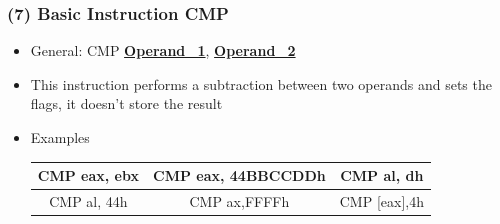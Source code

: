 \documentclass[]{beamer}
\begin{document}
		\begin{frame}
			\frametitle{(7) Basic Instruction CMP}
			\begin{itemize}
				\item{General: CMP \underline{\textbf{Operand\_1}}, \underline{\textbf{Operand\_2}}}\\

				\item{This instruction performs a subtraction between two operands and sets  the flags, it doesn't store the result}
				\item{Examples}
					\begin{table}[h]
						\begin{tabular}{|c|c|c|}
							\hline
							CMP eax, ebx&CMP eax, 44BBCCDDh&CMP al, dh\\
							\hline
							CMP al, 44h&CMP ax,FFFFh&CMP [eax],4h\\
							\hline
						\end{tabular}
					\end{table}
			\end{itemize}
		\end{frame}
\end{document}
